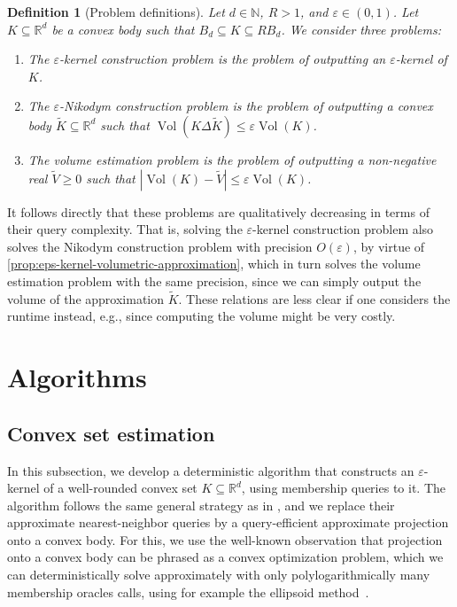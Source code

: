 \documentclass[11pt]{article}
\newtheorem{definition}[theorem]{Definition}
\newcommand{\N}{\ensuremath{\mathbb{N}}}
\newcommand{\R}{\ensuremath{\mathbb{R}}}
\DeclareMathOperator{\Vol}{Vol}
\begin{document}
    \begin{definition}[Problem definitions]
        \label{def:problems}
        Let $d \in \N$, $R > 1$, and $\varepsilon \in (0,1)$. Let $K \subseteq \R^d$ be a convex body such that $B_d \subseteq K \subseteq RB_d$. We consider three problems:
        \begin{enumerate}[nosep]
            \item The \emph{$\varepsilon$-kernel construction problem} is the problem of outputting an $\varepsilon$-kernel of $K$.
            \item The \emph{$\varepsilon$-Nikodym construction problem} is the problem of outputting a convex body $\widetilde{K} \subseteq \R^d$ such that $\Vol(K \Delta \widetilde{K}) \leq \varepsilon\Vol(K)$.
            \item The \emph{volume estimation problem} is the problem of outputting a non-negative real $\widetilde{V} \geq 0$ such that $|\Vol(K) - \widetilde{V}| \leq \varepsilon\Vol(K)$.
        \end{enumerate}
    \end{definition}

    It follows directly that these problems are qualitatively decreasing in terms of their query complexity. That is, solving the $\varepsilon$-kernel construction problem also solves the Nikodym construction problem with precision $O(\varepsilon)$, by virtue of \cref{prop:eps-kernel-volumetric-approximation}, which in turn solves the volume estimation problem with the same precision, since we can simply output the volume of the approximation $\widetilde{K}$. These relations are less clear if one considers the runtime instead, e.g., since computing the volume might be very costly.

    \section{Algorithms}
    \label{sec:algorithms}

    \subsection{Convex set estimation}
    \label{subsec:alg-conv-est}

    In this subsection, we develop a deterministic algorithm that constructs an $\varepsilon$-kernel of a well-rounded convex set $K \subseteq \R^d$, using membership queries to it. The algorithm follows the same general strategy as in \cite{yu2008practical}, and we replace their approximate nearest-neighbor queries by a query-efficient approximate projection onto a convex body. For this, we use the well-known observation that projection onto a convex body can be phrased as a convex optimization problem, which we can deterministically solve approximately with only polylogarithmically many membership oracles calls, using for example the ellipsoid method~\cite{grotschel2012geometric}.
\end{document}
